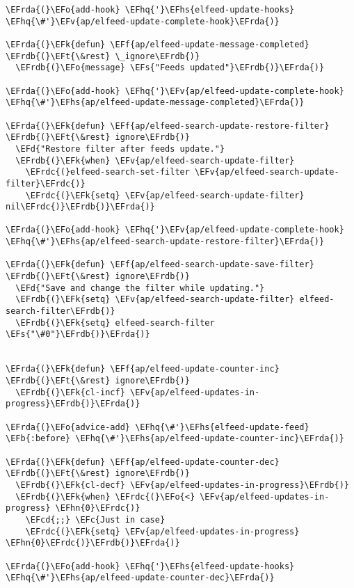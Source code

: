\documentclass[a4wide,10pt]{article}
\newcommand{\EFc}[1]{\textcolor{EFc}{#1}} %
\newcommand{\EFcd}[1]{\textcolor{EFcd}{#1}} %
\newcommand{\EFs}[1]{\textcolor{EFs}{#1}} %
\newcommand{\EFd}[1]{\textcolor{EFd}{#1}} %
\newcommand{\EFk}[1]{\textcolor{EFk}{#1}} %
\newcommand{\EFb}[1]{\textcolor{EFb}{#1}} %
\newcommand{\EFf}[1]{\textcolor{EFf}{#1}} %
\newcommand{\EFv}[1]{\textcolor{EFv}{#1}} %
\newcommand{\EFt}[1]{\textcolor{EFt}{#1}} %
\newcommand{\EFo}[1]{\textcolor{EFo}{#1}} %
\newcommand{\EFhn}[1]{\textcolor{EFhn}{\textbf{#1}}} %
\newcommand{\EFhq}[1]{\textcolor{EFhq}{#1}} %
\newcommand{\EFhs}[1]{\textcolor{EFhs}{#1}} %
\newcommand{\EFrda}[1]{\textcolor{EFrda}{#1}} %
\newcommand{\EFrdb}[1]{\textcolor{EFrdb}{#1}} %
\newcommand{\EFrdc}[1]{\textcolor{EFrdc}{#1}} %
\begin{document}
\begin{Code}
\begin{Verbatim}
\EFrda{(}\EFo{add-hook} \EFhq{'}\EFhs{elfeed-update-hooks} \EFhq{\#'}\EFv{ap/elfeed-update-complete-hook}\EFrda{)}

\EFrda{(}\EFk{defun} \EFf{ap/elfeed-update-message-completed} \EFrdb{(}\EFt{\&rest} \_ignore\EFrdb{)}
  \EFrdb{(}\EFo{message} \EFs{"Feeds updated"}\EFrdb{)}\EFrda{)}

\EFrda{(}\EFo{add-hook} \EFhq{'}\EFv{ap/elfeed-update-complete-hook} \EFhq{\#'}\EFhs{ap/elfeed-update-message-completed}\EFrda{)}

\EFrda{(}\EFk{defun} \EFf{ap/elfeed-search-update-restore-filter} \EFrdb{(}\EFt{\&rest} ignore\EFrdb{)}
  \EFd{"Restore filter after feeds update."}
  \EFrdb{(}\EFk{when} \EFv{ap/elfeed-search-update-filter}
    \EFrdc{(}elfeed-search-set-filter \EFv{ap/elfeed-search-update-filter}\EFrdc{)}
    \EFrdc{(}\EFk{setq} \EFv{ap/elfeed-search-update-filter} nil\EFrdc{)}\EFrdb{)}\EFrda{)}

\EFrda{(}\EFo{add-hook} \EFhq{'}\EFv{ap/elfeed-update-complete-hook} \EFhq{\#'}\EFhs{ap/elfeed-search-update-restore-filter}\EFrda{)}

\EFrda{(}\EFk{defun} \EFf{ap/elfeed-search-update-save-filter} \EFrdb{(}\EFt{\&rest} ignore\EFrdb{)}
  \EFd{"Save and change the filter while updating."}
  \EFrdb{(}\EFk{setq} \EFv{ap/elfeed-search-update-filter} elfeed-search-filter\EFrdb{)}
  \EFrdb{(}\EFk{setq} elfeed-search-filter \EFs{"\#0"}\EFrdb{)}\EFrda{)}


\EFrda{(}\EFk{defun} \EFf{ap/elfeed-update-counter-inc} \EFrdb{(}\EFt{\&rest} ignore\EFrdb{)}
  \EFrdb{(}\EFk{cl-incf} \EFv{ap/elfeed-updates-in-progress}\EFrdb{)}\EFrda{)}

\EFrda{(}\EFo{advice-add} \EFhq{\#'}\EFhs{elfeed-update-feed} \EFb{:before} \EFhq{\#'}\EFhs{ap/elfeed-update-counter-inc}\EFrda{)}

\EFrda{(}\EFk{defun} \EFf{ap/elfeed-update-counter-dec} \EFrdb{(}\EFt{\&rest} ignore\EFrdb{)}
  \EFrdb{(}\EFk{cl-decf} \EFv{ap/elfeed-updates-in-progress}\EFrdb{)}
  \EFrdb{(}\EFk{when} \EFrdc{(}\EFo{<} \EFv{ap/elfeed-updates-in-progress} \EFhn{0}\EFrdc{)}
    \EFcd{;;} \EFc{Just in case}
    \EFrdc{(}\EFk{setq} \EFv{ap/elfeed-updates-in-progress} \EFhn{0}\EFrdc{)}\EFrdb{)}\EFrda{)}

\EFrda{(}\EFo{add-hook} \EFhq{'}\EFhs{elfeed-update-hooks} \EFhq{\#'}\EFhs{ap/elfeed-update-counter-dec}\EFrda{)}


\end{Verbatim}
\end{Code}
\end{document}
